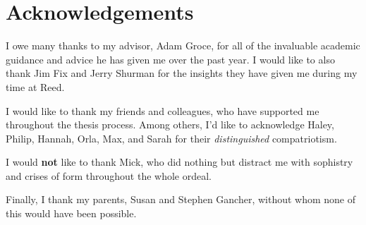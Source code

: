  \chapter*{Acknowledgements}
 I owe many thanks to my advisor, Adam Groce, for all of the invaluable academic guidance and advice he has given me over the past year. I would like to also thank Jim Fix and Jerry Shurman for the insights they have given me during my time at Reed.

 I would like to thank my friends and colleagues, who have supported me throughout the thesis process. Among others, I'd like to acknowledge Haley, Philip, Hannah, Orla, Max, and Sarah for their \emph{distinguished} compatriotism.

 I would \textbf{not} like to thank Mick, who did nothing but distract me with sophistry and crises of form throughout the whole ordeal.

 Finally, I thank my parents, Susan and Stephen Gancher, without whom none of this would have been possible.
